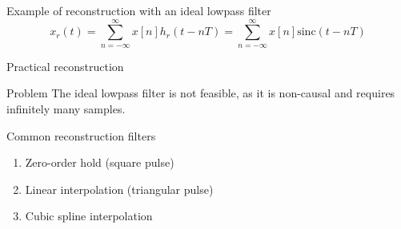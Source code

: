 \documentclass[10pt, aspectratio=169]{beamer}
\begin{document}
\begin{frame}{Example of reconstruction with an ideal lowpass filter}
	\vspace{-0.5cm}
	\begin{equation}
	x_r(t) = \sum_{n=-\infty}^{\infty} x[n]h_r(t-nT) = \sum_{n=-\infty}^{\infty} x[n]\mathrm{sinc}(t-nT) \tag{reconstruction}
	\end{equation}
	\begin{center}
		\resizebox{0.45\linewidth}{!}{}
	\end{center}
	
\end{frame}

\begin{frame}{Practical reconstruction}
	\begin{block}{Problem}
		The ideal lowpass filter is not feasible, as it is non-causal and requires infinitely many samples. 
	\end{block}

	\begin{block}{Common reconstruction filters}
		\begin{enumerate}
			\item Zero-order hold (square pulse)
			\item Linear interpolation (triangular pulse)
			\item Cubic spline interpolation
		\end{enumerate}
	\end{block}	
\end{frame}
\end{document}
